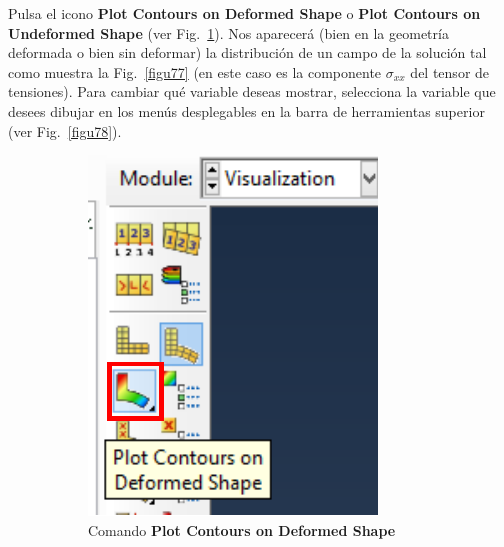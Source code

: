 \begin{enumerate}
  Pulsa el icono \textbf{Plot Contours on Deformed Shape} o
  \textbf{Plot Contours on Undeformed Shape} (ver
  Fig.~\ref{figu76}). Nos aparecerá (bien en la geometría deformada o
  bien sin deformar) la distribución de un campo de la solución tal
  como muestra la Fig.~\ref{figu77} (en este caso es la componente
  $\sigma_{xx}$ del tensor de tensiones). Para cambiar qué variable
  deseas mostrar, selecciona la variable que desees dibujar en los
  menús desplegables en la barra de herramientas superior (ver
  Fig.~\ref{figu78}).
  \begin{figure}[H]
    \centering
    \begin{subfigure}{0.19\textwidth}
      \includegraphics[width=\textwidth]{./body/images/imagen76.pdf}
      \caption{Comando \textbf{Plot Contours on Deformed Shape}}
      \label{figu76}
    \end{subfigure}%
    ~ %
    \begin{subfigure}{0.44\textwidth}

\end{subfigure}
\end{figure}
\end{enumerate}
